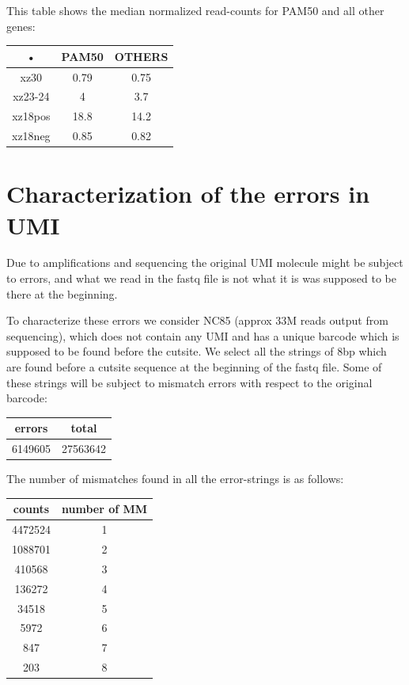 \documentclass[11pt,a4paper]{article}
\begin{document}
This table shows the median normalized read-counts for PAM50 and all other genes:

\begin{tabular}{|c|c|c|}
\hline 
• & PAM50 & OTHERS \\ 
\hline 
xz30 & 0.79 & 0.75 \\ 
\hline 
xz23-24 & 4 & 3.7 \\ 
\hline 
xz18pos & 18.8 & 14.2 \\ 
\hline 
xz18neg & 0.85 & 0.82 \\ 
\hline 
\end{tabular} 

\section{Characterization of the errors in UMI}
Due to amplifications and sequencing the original UMI molecule might 
be subject to errors, and what we read in the fastq file is not what 
it is was supposed to be there at the beginning. 

To characterize these errors we consider NC85 (approx 33M reads output from sequencing), which does not contain 
any UMI and has a unique barcode which is supposed to be found before the 
cutsite. We select all the strings of 8bp which are found before a cutsite 
sequence at the beginning of the fastq file. Some of these strings will be 
subject to mismatch errors with respect to the original barcode: 

\begin{tabular}{|c|c|}
\hline 
errors & total \\ 
\hline 
6149605 & 27563642 \\ 
\hline 
\end{tabular} 

The number of mismatches found in all the error-strings is as follows:

\begin{tabular}{|c|c|}
\hline 
counts & number of MM \\ 
\hline 
4472524 & 1 \\ 
\hline 
1088701 & 2 \\ 
\hline 
410568 & 3 \\ 
\hline 
136272 & 4 \\ 
\hline 
34518 & 5 \\ 
\hline 
5972 & 6 \\ 
\hline 
847 & 7 \\ 
\hline 
203 & 8 \\ 
\hline 
\end{tabular}
\end{document}
